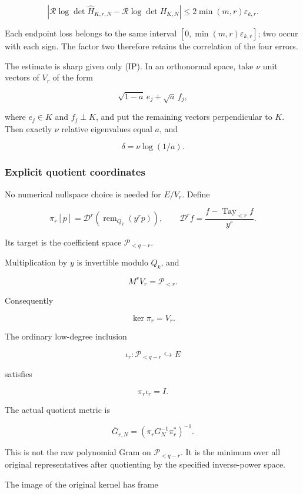 \documentclass[11pt]{article}
\begin{document}
\[
\boxed{
\left|
\mathcal R\log\det\widehat H_{K,r,N}
-\mathcal R\log\det H_{K,N}
\right|
\le2\min(m,r)\varepsilon_{k,r}.
}
\tag{9}
\]

Each endpoint loss belongs to the same interval \([0,\min(m,r)\varepsilon_{k,r}]\); two occur with each sign. The factor two therefore retains the correlation of the four errors.

The estimate is sharp given only (IP). In an orthonormal space, take \(\nu\) unit vectors of \(V_r\) of the form

\[
\sqrt{1-a}\,e_j+\sqrt a\,f_j,
\]

where \(e_j\in K\) and \(f_j\perp K\), and put the remaining vectors perpendicular to \(K\). Then exactly \(\nu\) relative eigenvalues equal \(a\), and

\[
\delta=\nu\log(1/a).
\]

\subsubsection{Explicit quotient coordinates}\label{explicit-quotient-coordinates}

No numerical nullspace choice is needed for \(E/V_r\). Define

\[
\boxed{
\pi_r[p]
=
\mathscr D^r\!\left(\operatorname{rem}_{Q_k}(y^rp)\right),
\qquad
\mathscr D^rf=
\frac{f-\operatorname{Tay}_{<r}f}{y^r}.
}
\tag{10}
\]

Its target is the coefficient space \(\mathcal P_{<q-r}\).

Multiplication by \(y\) is invertible modulo \(Q_k\), and

\[
M^rV_r=\mathcal P_{<r}.
\]

Consequently

\[
\ker\pi_r=V_r.
\]

The ordinary low-degree inclusion

\[
\iota_r:\mathcal P_{<q-r}\hookrightarrow E
\]

satisfies

\[
\pi_r\iota_r=I.
\]

The actual quotient metric is

\[
\boxed{
\overline G_{r,N}
=
(\pi_rG_N^{-1}\pi_r^*)^{-1}.
}
\tag{11}
\]

This is not the raw polynomial Gram on \(\mathcal P_{<q-r}\). It is the minimum over all original representatives after quotienting by the specified inverse-power space.

The image of the original kernel has frame
\end{document}
